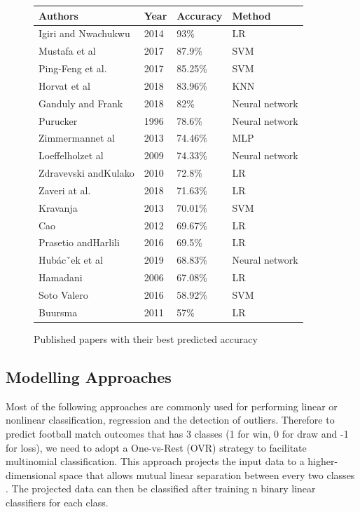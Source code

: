 \documentclass[8pt]{article}
\begin{document}
\begin{figure}[H]
    \centering
    \begin{tabular}{ |p{4cm}||p{4cm}|p{3cm}|p{4cm}| }

\hline
Authors & Year & Accuracy & Method \\
\hline
Igiri and Nwachukwu & 	2014 & 	93\% & 	LR \\ 
Mustafa et al & 	2017 & 	87.9\% & 	SVM \\ 
Ping-Feng et al. & 	2017 & 	85.25\% & 	SVM \\ 
Horvat et al & 	2018 & 	83.96\% & 	KNN \\ 
Ganduly and Frank & 	2018 & 	82\% & 	Neural network \\ 
Purucker & 	1996 & 	78.6\% & 	Neural network \\ 
Zimmermannet al & 	2013 & 	74.46\% & 	MLP \\ 
Loeffelholzet al & 	2009 & 	74.33\% & 	Neural network \\ 
Zdravevski andKulako & 	2010 & 	72.8\% & 	LR \\ 
Zaveri at al. & 	2018 & 	71.63\% & 	LR \\ 
Kravanja & 	2013 & 	70.01\% & 	SVM \\ 
Cao & 	2012 & 	69.67\% & 	LR \\ 
Prasetio andHarlili  & 	2016 & 	69.5\% & 	LR \\ 
Hubácˇek et al & 	2019 & 	68.83\% & 	Neural network \\ 
Hamadani & 	2006 & 	67.08\% & 	LR \\ 
Soto Valero & 	2016 & 	58.92\% & 	SVM \\ 
Buursma & 	2011 & 	57\% & 	LR \\ 

\hline
\end{tabular}
    \caption{Published papers with their best predicted accuracy \cite{horvat}}
    \label{fig:table}
\end{figure}

\subsection{Modelling Approaches}
Most of the following approaches are commonly used for performing linear or nonlinear classification, regression and the detection of outliers. Therefore to predict football match outcomes that has 3 classes (1 for win, 0 for draw and -1 for loss), we need to adopt a One-vs-Rest (OVR) strategy to facilitate multinomial classification. This approach projects the input data to a higher-dimensional space that allows mutual linear separation between every two classes \cite{baeldung}. The projected data can then be classified after training n binary linear classifiers for each class.
\end{document}
